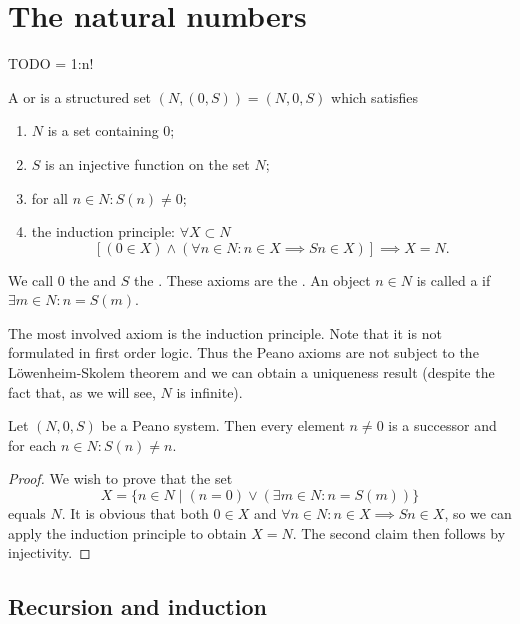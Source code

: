 \chapter{The natural numbers}
TODO = 1:n!
\begin{definition}
A  or  is a structured set $(N,(0,S)) = (N,0,S)$ which satisfies
\begin{enumerate}
\item $N$ is a set containing $0$;
\item $S$ is an injective function on the set $N$;
\item for all $n\in N: S(n) \neq 0$;
\item the induction principle: $\forall X\subset N$
\[ [(0\in X) \land (\forall n\in N: n\in X \implies Sn \in X)] \implies X = N. \]
\end{enumerate}
We call $0$ the  and $S$ the . These axioms are the . An object $n\in N$ is called a  if $\exists m\in N: n = S(m)$.
\end{definition}
The most involved axiom is the induction principle. Note that it is not formulated in first order logic. Thus the Peano axioms are not subject to the Löwenheim-Skolem theorem and we can obtain a uniqueness result (despite the fact that, as we will see, $N$ is infinite).

\begin{lemma} \label{successor}
Let $(N,0,S)$ be a Peano system. Then every element $n\neq 0$ is a successor and for each $n\in N: S(n) \neq n$.
\end{lemma}
\begin{proof}
We wish to prove that the set
\[ X = \{n\in N\;|\; (n=0)\lor(\exists m\in N: n = S(m))\} \]
equals $N$. It is obvious that both $0\in X$ and $\forall n\in N: n\in X \implies Sn \in X$, so we can apply the induction principle to obtain $X=N$. The second claim then follows by injectivity.
\end{proof}
\section{Recursion and induction}
